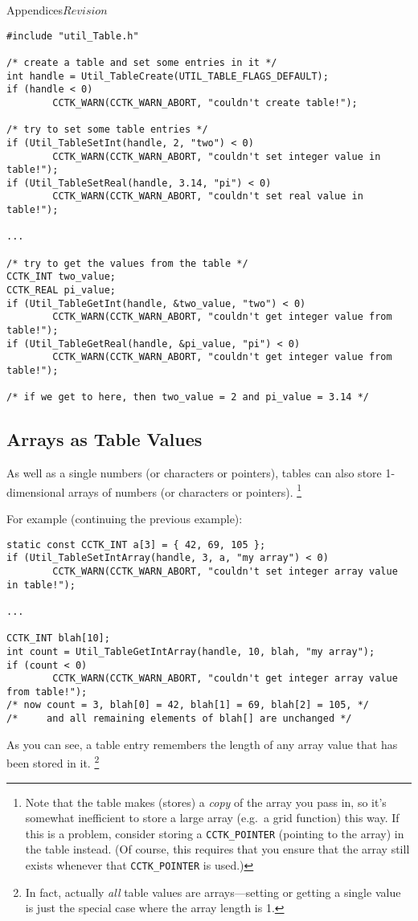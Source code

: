 \begin{cactuspart}{Appendices}{}{$Revision$}
\begin{verbatim}
#include "util_Table.h"

/* create a table and set some entries in it */
int handle = Util_TableCreate(UTIL_TABLE_FLAGS_DEFAULT);
if (handle < 0)
        CCTK_WARN(CCTK_WARN_ABORT, "couldn't create table!");

/* try to set some table entries */
if (Util_TableSetInt(handle, 2, "two") < 0)
        CCTK_WARN(CCTK_WARN_ABORT, "couldn't set integer value in table!");
if (Util_TableSetReal(handle, 3.14, "pi") < 0)
        CCTK_WARN(CCTK_WARN_ABORT, "couldn't set real value in table!");

...

/* try to get the values from the table */
CCTK_INT two_value;
CCTK_REAL pi_value;
if (Util_TableGetInt(handle, &two_value, "two") < 0)
        CCTK_WARN(CCTK_WARN_ABORT, "couldn't get integer value from table!");
if (Util_TableGetReal(handle, &pi_value, "pi") < 0)
        CCTK_WARN(CCTK_WARN_ABORT, "couldn't get integer value from table!");

/* if we get to here, then two_value = 2 and pi_value = 3.14 */
\end{verbatim}


\subsection{Arrays as Table Values}

As well as a single numbers (or characters or pointers), tables can
also store 1-dimensional arrays of numbers (or characters or pointers).%
\footnote{%
	 Note that the table makes (stores) a \emph{copy} of the array
	 you pass in, so it's somewhat inefficient to store a large array
	 (e.g.~a grid function) this way.  If this is a problem, consider
	 storing a \texttt{CCTK\_POINTER} (pointing to the array) in the table
	 instead.  (Of course, this requires that you ensure that the array still exists whenever that \texttt{CCTK\_POINTER} is used.)
	 }%

For example (continuing the previous example):
\begin{verbatim}
static const CCTK_INT a[3] = { 42, 69, 105 };
if (Util_TableSetIntArray(handle, 3, a, "my array") < 0)
        CCTK_WARN(CCTK_WARN_ABORT, "couldn't set integer array value in table!");

...

CCTK_INT blah[10];
int count = Util_TableGetIntArray(handle, 10, blah, "my array");
if (count < 0)
        CCTK_WARN(CCTK_WARN_ABORT, "couldn't get integer array value from table!");
/* now count = 3, blah[0] = 42, blah[1] = 69, blah[2] = 105, */
/*     and all remaining elements of blah[] are unchanged */
\end{verbatim}
As you can see, a table entry remembers the length of any array
value that has been stored in it.%
\footnote{%
	 In fact, actually \emph{all} table values are
	 arrays---setting or getting a single value is
	 just the special case where the array length is 1.
	 }%
{}


\end{cactuspart}
